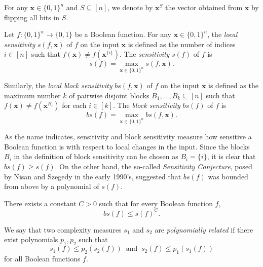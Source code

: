 For any $\bm{x} \in \{0, 1\}^n$ and $S \subseteq [n]$, we denote by $\bm{x}^S$ the vector obtained from $\bm{x}$ by flipping all bits in $S$.

\begin{definition}
    Let $f: \{0, 1\}^n \rightarrow \{0, 1 \}$ be a Boolean function. 
    For any $\bm{x} \in \{0, 1\}^n$, the \textit{local sensitivity} $s(f, \bm{x})$ of $f$ on the input $\bm{x}$ is defined as the number of indices $i \in [n]$ such that $f(\bm{x}) \ne f(\bm{x}^{\{i \}} )$.
    The \textit{sensitivity} $s(f)$ of $f$ is 
    \begin{equation*}
        s(f) = \max \limits_{\bm{x} \in \{0, 1\}^n} s(f, \bm{x}).
    \end{equation*}

    Similarly, the \textit{local block sensitivity} $bs(f, \bm{x})$ of $f$ on the input $\bm{x}$ is defined as the maximum number $k$ of pairwise disjoint blocks $B_1, \dots, B_k \subseteq [n]$ such that $f(\bm{x}) \ne f(\bm{x}^{B_i})$ for each $i \in [k]$.
    The \textit{block sensitivity} $bs(f)$ of $f$ is 
    \begin{equation*}
        bs(f) = \max \limits_{\bm{x} \in \{0, 1\}^n} bs(f, \bm{x}).
    \end{equation*}
\end{definition} 

As the name indicates, sensitivity and block sensitivity measure how sensitive a Boolean function is with respect to local changes in the input.
Since the blocks $B_i$ in the definition of block sensitivity can be chosen as $B_i = \{i \}$, it is clear that $bs(f) \ge s(f)$.
On the other hand, the so-called \textit{Sensitivity Conjecture}, posed by Nisan and Szegedy \cite{nisanszegedy} in the early 1990's, suggested that $bs(f)$ was bounded from above by a polynomial of $s(f)$.

\begin{conjecture}
    There exists a constant $C > 0$ such that for every Boolean function $f$, 
    \begin{equation*}
        bs(f) \le s(f)^C.
    \end{equation*}
\end{conjecture}

We say that two complexity measures $s_1$ and $s_2$ are \textit{polynomially related} if there exist polynomials $p_1, p_2$ such that 
\begin{equation*}
    s_1(f) \le p_2(s_2(f)) \ \text{ and } \ s_2(f) \le p_1(s_1(f))
\end{equation*}
for all Boolean functions $f$.

